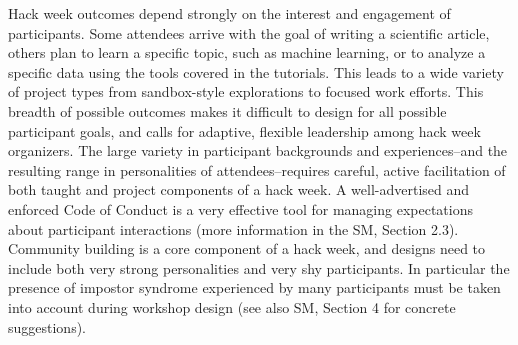 
Hack week outcomes depend strongly on the interest and engagement of participants.
Some attendees arrive with the goal of writing a scientific article, others plan to learn a specific topic, such as machine learning, or to analyze a specific data using the tools covered in the tutorials.
This leads to a wide variety of project types from sandbox-style explorations to focused work efforts.
This breadth of possible outcomes makes it difficult to design for all possible participant goals, and calls for adaptive, flexible leadership among hack week organizers.
The large variety in participant backgrounds and experiences--and the resulting range in personalities of attendees--requires careful, active facilitation of both taught and project components of a hack week. A well-advertised and enforced Code of Conduct is a very effective tool for managing expectations about participant interactions (more information in the SM, Section 2.3). 
Community building is a core component of a hack week, and designs need to include both very strong personalities and very shy participants. In particular the presence of impostor syndrome experienced by many participants must be taken into account during workshop design (see also SM, Section 4 for concrete suggestions).